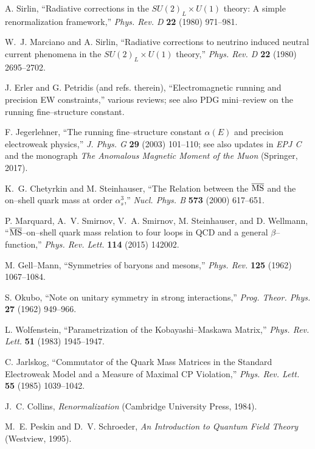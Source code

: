 \documentclass[epjc3]{svjour3}
\begin{document}
\begin{thebibliography}{99}
A. Sirlin, ``Radiative corrections in the $SU(2)_L \times U(1)$ theory: A simple renormalization framework,'' \emph{Phys. Rev. D} \textbf{22} (1980) 971–981.

W.~J. Marciano and A. Sirlin, ``Radiative corrections to neutrino induced neutral current phenomena in the $SU(2)_L \times U(1)$ theory,'' \emph{Phys. Rev. D} \textbf{22} (1980) 2695–2702.

J. Erler and G. Petridis (and refs. therein), ``Electromagnetic running and precision EW constraints,'' various reviews; see also PDG mini–review on the running fine–structure constant.

F. Jegerlehner, ``The running fine–structure constant $\alpha(E)$ and precision electroweak physics,'' \emph{J. Phys. G} \textbf{29} (2003) 101–110; see also updates in \emph{EPJ C} and the monograph \emph{The Anomalous Magnetic Moment of the Muon} (Springer, 2017).

K.~G. Chetyrkin and M. Steinhauser, ``The Relation between the $\overline{\rm MS}$ and the on–shell quark mass at order $\alpha_s^3$,'' \emph{Nucl. Phys. B} \textbf{573} (2000) 617–651.

P. Marquard, A.~V. Smirnov, V.~A. Smirnov, M. Steinhauser, and D. Wellmann, ``$\overline{\rm MS}$–on–shell quark mass relation to four loops in QCD and a general $\beta$–function,'' \emph{Phys. Rev. Lett.} \textbf{114} (2015) 142002.

M. Gell–Mann, ``Symmetries of baryons and mesons,'' \emph{Phys. Rev.} \textbf{125} (1962) 1067–1084.

S. Okubo, ``Note on unitary symmetry in strong interactions,'' \emph{Prog. Theor. Phys.} \textbf{27} (1962) 949–966.

L. Wolfenstein, ``Parametrization of the Kobayashi–Maskawa Matrix,'' \emph{Phys. Rev. Lett.} \textbf{51} (1983) 1945–1947.

C. Jarlskog, ``Commutator of the Quark Mass Matrices in the Standard Electroweak Model and a Measure of Maximal CP Violation,'' \emph{Phys. Rev. Lett.} \textbf{55} (1985) 1039–1042.

J.~C. Collins, \emph{Renormalization} (Cambridge University Press, 1984).

M.~E. Peskin and D.~V. Schroeder, \emph{An Introduction to Quantum Field Theory} (Westview, 1995).


\end{thebibliography}
\end{document}
